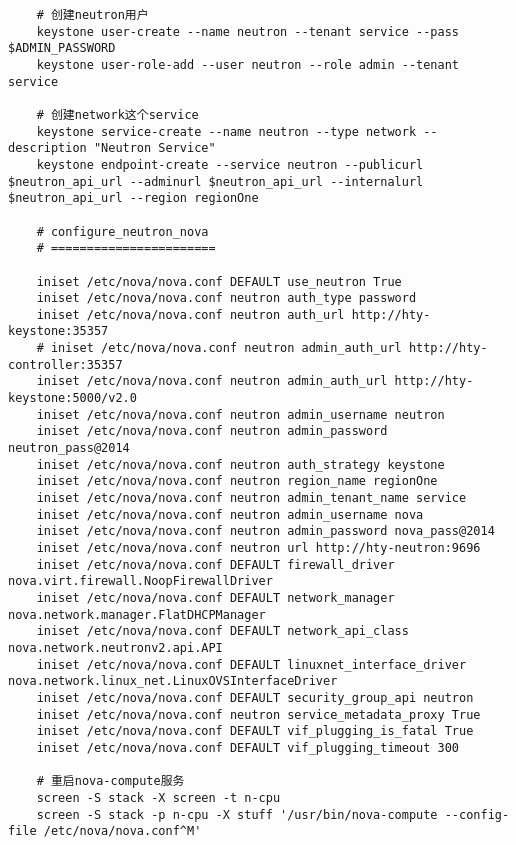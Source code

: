 \documentclass[a4paper,left=1.5cm,right=1.5cm,11pt]{article}
\begin{document}
\begin{lstlisting}
	# 创建neutron用户
	keystone user-create --name neutron --tenant service --pass $ADMIN_PASSWORD
	keystone user-role-add --user neutron --role admin --tenant service

	# 创建network这个service
	keystone service-create --name neutron --type network --description "Neutron Service"
	keystone endpoint-create --service neutron --publicurl $neutron_api_url --adminurl $neutron_api_url --internalurl $neutron_api_url --region regionOne

	# configure_neutron_nova
	# =======================

	iniset /etc/nova/nova.conf DEFAULT use_neutron True
	iniset /etc/nova/nova.conf neutron auth_type password
	iniset /etc/nova/nova.conf neutron auth_url http://hty-keystone:35357
	# iniset /etc/nova/nova.conf neutron admin_auth_url http://hty-controller:35357
	iniset /etc/nova/nova.conf neutron admin_auth_url http://hty-keystone:5000/v2.0
	iniset /etc/nova/nova.conf neutron admin_username neutron
	iniset /etc/nova/nova.conf neutron admin_password neutron_pass@2014
	iniset /etc/nova/nova.conf neutron auth_strategy keystone
	iniset /etc/nova/nova.conf neutron region_name regionOne
	iniset /etc/nova/nova.conf neutron admin_tenant_name service
	iniset /etc/nova/nova.conf neutron admin_username nova
	iniset /etc/nova/nova.conf neutron admin_password nova_pass@2014
	iniset /etc/nova/nova.conf neutron url http://hty-neutron:9696
	iniset /etc/nova/nova.conf DEFAULT firewall_driver nova.virt.firewall.NoopFirewallDriver
	iniset /etc/nova/nova.conf DEFAULT network_manager nova.network.manager.FlatDHCPManager
	iniset /etc/nova/nova.conf DEFAULT network_api_class nova.network.neutronv2.api.API
	iniset /etc/nova/nova.conf DEFAULT linuxnet_interface_driver nova.network.linux_net.LinuxOVSInterfaceDriver
	iniset /etc/nova/nova.conf DEFAULT security_group_api neutron
	iniset /etc/nova/nova.conf neutron service_metadata_proxy True
	iniset /etc/nova/nova.conf DEFAULT vif_plugging_is_fatal True
	iniset /etc/nova/nova.conf DEFAULT vif_plugging_timeout 300

	# 重启nova-compute服务
	screen -S stack -X screen -t n-cpu
	screen -S stack -p n-cpu -X stuff '/usr/bin/nova-compute --config-file /etc/nova/nova.conf^M'
	\end{lstlisting}
\end{document}
